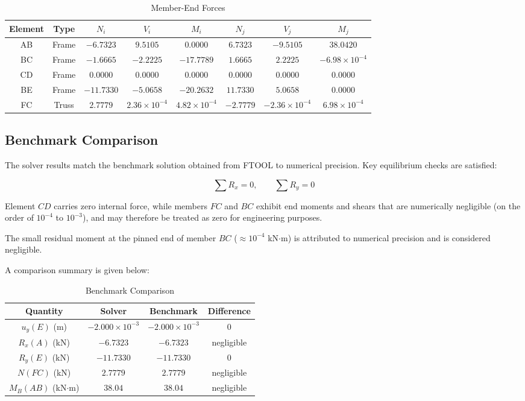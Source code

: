 \begin{table}[H]
\centering
\caption{Member-End Forces}
\begin{tabular}{cccccccc}
\toprule
Element & Type & $N_i$ & $V_i$ & $M_i$ & $N_j$ & $V_j$ & $M_j$ \\
\midrule
AB & Frame & $-6.7323$ & $9.5105$ & $0.0000$ & $6.7323$ & $-9.5105$ & $38.0420$ \\
BC & Frame & $-1.6665$ & $-2.2225$ & $-17.7789$ & $1.6665$ & $2.2225$ & $-6.98\times10^{-4}$ \\
CD & Frame & $0.0000$ & $0.0000$ & $0.0000$ & $0.0000$ & $0.0000$ & $0.0000$ \\
BE & Frame & $-11.7330$ & $-5.0658$ & $-20.2632$ & $11.7330$ & $5.0658$ & $0.0000$ \\
FC & Truss & $2.7779$ & $2.36\times10^{-4}$ & $4.82\times10^{-4}$ & $-2.7779$ & $-2.36\times10^{-4}$ & $6.98\times10^{-4}$ \\
\bottomrule
\end{tabular}
\end{table}

\subsection{Benchmark Comparison}

The solver results match the benchmark solution obtained from FTOOL to numerical precision. Key equilibrium checks are satisfied:

\[
\sum R_x = 0, \qquad \sum R_y = 0
\]

Element $CD$ carries zero internal force, while members $FC$ and $BC$ exhibit end moments and shears that are numerically negligible (on the order of $10^{-4}$ to $10^{-3}$), and may therefore be treated as zero for engineering purposes.

The small residual moment at the pinned end of member $BC$ ($\approx 10^{-4}$ kN$\cdot$m) is attributed to numerical precision and is considered negligible.

A comparison summary is given below:

\begin{table}[H]
\centering
\caption{Benchmark Comparison}
\begin{tabular}{cccc}
\toprule
Quantity & Solver & Benchmark & Difference \\
\midrule
$u_y(E)$ (m) & $-2.000\times10^{-3}$ & $-2.000\times10^{-3}$ & 0 \\
$R_x(A)$ (kN) & $-6.7323$ & $-6.7323$ & negligible \\
$R_y(E)$ (kN) & $-11.7330$ & $-11.7330$ & 0 \\
$N(FC)$ (kN) & $2.7779$ & $2.7779$ & negligible \\
$M_B(AB)$ (kN$\cdot$m) & $38.04$ & $38.04$ & negligible \\
\bottomrule
\end{tabular}
\end{table}

